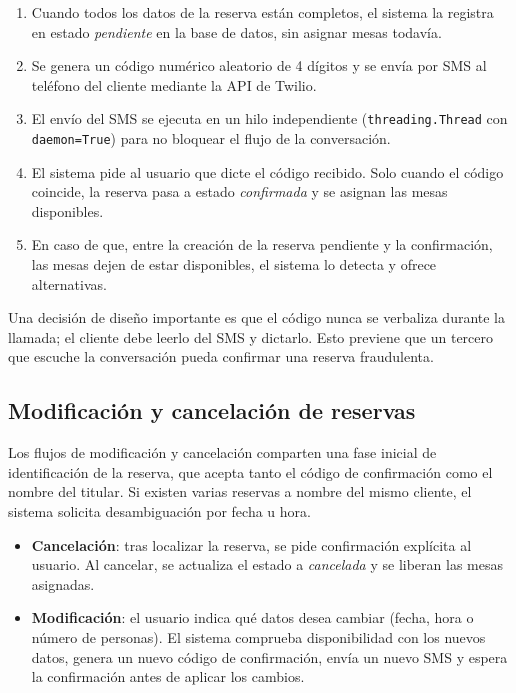 \begin{enumerate}
    \item Cuando todos los datos de la reserva están completos, el sistema la registra en estado \textit{pendiente} en la base de datos, sin asignar mesas todavía.
    \item Se genera un código numérico aleatorio de 4 dígitos y se envía por SMS al teléfono del cliente mediante la API de Twilio.
    \item El envío del SMS se ejecuta en un hilo independiente (\texttt{threading.Thread} con \texttt{daemon=True}) para no bloquear el flujo de la conversación.
    \item El sistema pide al usuario que dicte el código recibido. Solo cuando el código coincide, la reserva pasa a estado \textit{confirmada} y se asignan las mesas disponibles.
    \item En caso de que, entre la creación de la reserva pendiente y la confirmación, las mesas dejen de estar disponibles, el sistema lo detecta y ofrece alternativas.
\end{enumerate}

Una decisión de diseño importante es que el código nunca se verbaliza durante la llamada; el cliente debe leerlo del SMS y dictarlo. Esto previene que un tercero que escuche la conversación pueda confirmar una reserva fraudulenta.

\subsection{Modificación y cancelación de reservas}
\label{subsec:modificacion_cancelacion}

Los flujos de modificación y cancelación comparten una fase inicial de identificación de la reserva, que acepta tanto el código de confirmación como el nombre del titular. Si existen varias reservas a nombre del mismo cliente, el sistema solicita desambiguación por fecha u hora.

\begin{itemize}
    \item \textbf{Cancelación}: tras localizar la reserva, se pide confirmación explícita al usuario. Al cancelar, se actualiza el estado a \textit{cancelada} y se liberan las mesas asignadas.
    \item \textbf{Modificación}: el usuario indica qué datos desea cambiar (fecha, hora o número de personas). El sistema comprueba disponibilidad con los nuevos datos, genera un nuevo código de confirmación, envía un nuevo SMS y espera la confirmación antes de aplicar los cambios.
\end{itemize}

